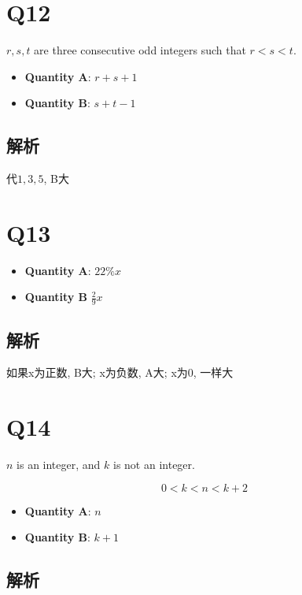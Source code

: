 \section{Q12}

  $ r, s, t $ are three consecutive odd integers such that $ r < s < t $.

  \begin{itemize}
    \item \textbf{Quantity A}: $ r + s + 1 $
    \item \textbf{Quantity B}: $ s + t - 1 $
  \end{itemize}

  \subsection{解析}

    代$ 1, 3, 5 $, B大

\section{Q13}

  \begin{itemize}
    \item \textbf{Quantity A}: $ 22\% x $
    \item \textbf{Quantity B} $ \frac{2}{9}x $
  \end{itemize}

  \subsection{解析}

    如果x为正数, B大; x为负数, A大; x为0, 一样大

\section{Q14}

  $ n $ is an integer, and $ k $ is not an integer.

  \begin{equation*}
    0 < k < n < k + 2
  \end{equation*}

  \begin{itemize}
    \item \textbf{Quantity A}: $ n $
    \item \textbf{Quantity B}: $ k + 1 $
  \end{itemize}

  \subsection{解析}

